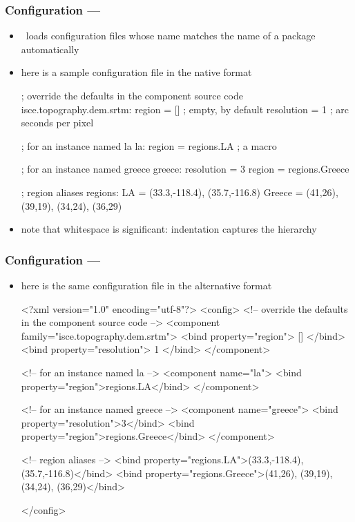 \begin{frame}[fragile]
%
  \label{frame:srtm-pfg}
%
  \frametitle{Configuration --- }
%
  \begin{itemize}
%
    \item \pyre\ loads configuration files whose name matches the name of a package automatically
%
    \item here is a sample configuration file in the native  format
%
      \begin{ipfg}[gobble=6]{}
        ; override the defaults in the component source code
        isce.topography.dem.srtm:
            region = [] ; empty, by default
            resolution = 1 ; arc seconds per pixel

        ; for an instance named la
        la:
            region = {regions.LA} ; a macro

        ; for an instance named greece
        greece:
            resolution = 3
            region = {regions.Greece}

        ; region aliases
        regions:
            LA = (33.3,-118.4), (35.7,-116.8)
            Greece = (41,26), (39,19), (34,24), (36,29)
      \end{ipfg}
%
    \item note that whitespace is significant: indentation captures the hierarchy
%
  \end{itemize}
%
\end{frame}

\begin{frame}[fragile]
%
  \label{frame:srtm-pml}
%
  \frametitle{Configuration --- }
%
  \begin{itemize}
%
    \item here is the same configuration file in the alternative  format
%
      \begin{ipml}[gobble=6]{}
        <?xml version="1.0" encoding="utf-8"?>
        <config>
          <!-- override the defaults in the component source code -->
          <component family="isce.topography.dem.srtm">
            <bind property="region"> [] </bind>
            <bind property="resolution"> 1 </bind>
          </component>

          <!-- for an instance named la -->
          <component name="la">
            <bind property="region">{regions.LA}</bind>
          </component>

          <!-- for an instance named greece -->
          <component name="greece">
            <bind property="resolution">3</bind>
            <bind property="region">{regions.Greece}</bind>
            </component>

          <!-- region aliases -->
          <bind property="regions.LA">(33.3,-118.4), (35.7,-116.8)</bind>
          <bind property="regions.Greece">(41,26), (39,19), (34,24), (36,29)</bind>

        </config>
      \end{ipml}
%
  \end{itemize}
%
\end{frame}

